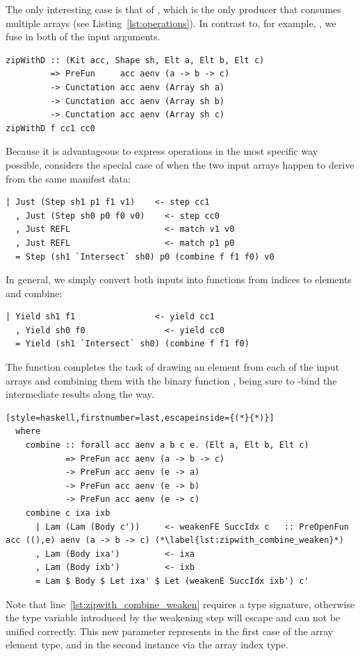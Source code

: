 The only interesting case is that of , which is the only producer
that consumes multiple arrays (see Listing~\ref{lst:operations}). In contrast
to, for example, , we fuse in both
of the input arguments.
%
\begin{lstlisting}[style=haskell]
zipWithD :: (Kit acc, Shape sh, Elt a, Elt b, Elt c)
         => PreFun     acc aenv (a -> b -> c)
         -> Cunctation acc aenv (Array sh a)
         -> Cunctation acc aenv (Array sh b)
         -> Cunctation acc aenv (Array sh c)
zipWithD f cc1 cc0
\end{lstlisting}
%
Because it is advantageous to express operations in the most specific way
possible,  considers the special case of when the two input arrays
happen to derive from the same manifest data:
%
\begin{lstlisting}[style=haskell,firstnumber=last]
  | Just (Step sh1 p1 f1 v1)    <- step cc1
  , Just (Step sh0 p0 f0 v0)    <- step cc0
  , Just REFL                   <- match v1 v0
  , Just REFL                   <- match p1 p0
  = Step (sh1 `Intersect` sh0) p0 (combine f f1 f0) v0
\end{lstlisting}
%
In general, we simply convert both inputs into functions from indices to
elements and combine:
%
\begin{lstlisting}[style=haskell,firstnumber=last]
  | Yield sh1 f1                <- yield cc1
  , Yield sh0 f0                <- yield cc0
  = Yield (sh1 `Intersect` sh0) (combine f f1 f0)
\end{lstlisting}
%
The function  completes the task of drawing an element from each
of the input arrays and combining them with the binary function , being
sure to -bind the intermediate results along the way.
%
\begin{lstlisting}[style=haskell,firstnumber=last,escapeinside={(*}{*)}]
  where
    combine :: forall acc aenv a b c e. (Elt a, Elt b, Elt c)
            => PreFun acc aenv (a -> b -> c)
            -> PreFun acc aenv (e -> a)
            -> PreFun acc aenv (e -> b)
            -> PreFun acc aenv (e -> c)
    combine c ixa ixb
      | Lam (Lam (Body c'))     <- weakenFE SuccIdx c   :: PreOpenFun acc ((),e) aenv (a -> b -> c) (*\label{lst:zipwith_combine_weaken}*)
      , Lam (Body ixa')         <- ixa
      , Lam (Body ixb')         <- ixb
      = Lam $ Body $ Let ixa' $ Let (weakenE SuccIdx ixb') c'
\end{lstlisting}
%
Note that line~\ref{lst:zipwith_combine_weaken} requires a type signature,
otherwise the type variable  introduced by the weakening step will
escape and can not be unified correctly. This new parameter  represents
in the first case of  the array element type, and in the second
instance via  the array index type.



